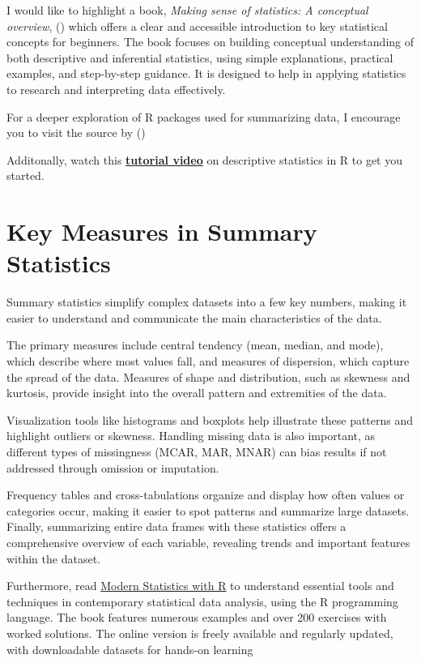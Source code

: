 \documentclass[
  man,
  floatsintext,
  longtable,
  nolmodern,
  notxfonts,
  notimes,
  colorlinks=true,linkcolor=blue,citecolor=blue,urlcolor=blue]{apa7}
\begin{document}
I would like to highlight a book, \emph{Making sense of statistics: A
conceptual overview}, ()
which offers a clear and accessible introduction to key statistical
concepts for beginners. The book focuses on building conceptual
understanding of both descriptive and inferential statistics, using
simple explanations, practical examples, and step-by-step guidance. It
is designed to help in applying statistics to research and interpreting
data effectively.

For a deeper exploration of R packages used for summarizing data, I
encourage you to visit the source by
()

Additonally, watch this
\href{https://www.youtube.com/watch?v=yoPGwvUzjgQ}{\textbf{tutorial
video}} on descriptive statistics in R to get you started.

\section{Key Measures in Summary
Statistics}\label{key-measures-in-summary-statistics}

Summary statistics simplify complex datasets into a few key numbers,
making it easier to understand and communicate the main characteristics
of the data.

The primary measures include central tendency (mean, median, and mode),
which describe where most values fall, and measures of dispersion, which
capture the spread of the data. Measures of shape and distribution, such
as skewness and kurtosis, provide insight into the overall pattern and
extremities of the data.

Visualization tools like histograms and boxplots help illustrate these
patterns and highlight outliers or skewness. Handling missing data is
also important, as different types of missingness (MCAR, MAR, MNAR) can
bias results if not addressed through omission or imputation.

Frequency tables and cross-tabulations organize and display how often
values or categories occur, making it easier to spot patterns and
summarize large datasets. Finally, summarizing entire data frames with
these statistics offers a comprehensive overview of each variable,
revealing trends and important features within the dataset.

Furthermore, read
\href{https://modernstatisticswithr.com/index.html}{Modern Statistics
with R} to understand essential tools and techniques in contemporary
statistical data analysis, using the R programming language. The book
features numerous examples and over 200 exercises with worked solutions.
The online version is freely available and regularly updated, with
downloadable datasets for hands-on learning
\end{document}
